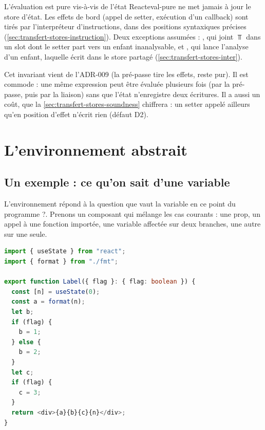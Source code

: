 \begin{invariant}{L'évaluation est pure vis-à-vis de l'état React}{eval-pure}
   ne met jamais à jour le store d'état. Les effets de
  bord (appel de setter, exécution d'un callback) sont tirés par
  l'interpréteur d'instructions, dans des positions syntaxiques précises
  (\cref{sec:transfert-stores-instruction}). Deux exceptions assumées :
  , qui joint $\Top$ dans un slot dont le setter
  part vers un enfant inanalysable, et , qui lance
  l'analyse d'un enfant, laquelle écrit dans le store partagé
  (\cref{sec:transfert-stores-inter}).
\end{invariant}

Cet invariant vient de l'ADR-009 (\og la pré-passe tire les effets,
 reste pur\fg{}). Il est commode : une même expression peut être
évaluée plusieurs fois (par la pré-passe, puis par la liaison) sans que
l'état n'enregistre deux écritures. Il a aussi un coût, que la
\cref{sec:transfert-stores-soundness} chiffrera : un setter appelé ailleurs
qu'en position d'effet n'écrit rien (défaut D2).

\section{L'environnement abstrait}
\label{sec:transfert-stores-env}

\subsection{Un exemple : ce qu'on sait d'une variable}

L'environnement répond à la question \og que vaut la variable  en ce
point du programme ?\fg{}. Prenons un composant qui mélange les cas
courants : une prop, un appel à une fonction importée, une variable affectée
sur deux branches, une autre sur une seule.

\begin{lstlisting}[language=TypeScript,caption={Ce qu'on sait d'une variable (\file{/tmp/ch11/env.tsx})},label={lst:transfert-stores-env}]
import { useState } from "react";
import { format } from "./fmt";

export function Label({ flag }: { flag: boolean }) {
  const [n] = useState(0);
  const a = format(n);
  let b;
  if (flag) {
    b = 1;
  } else {
    b = 2;
  }
  let c;
  if (flag) {
    c = 3;
  }
  return <div>{a}{b}{c}{n}</div>;
}
\end{lstlisting}

